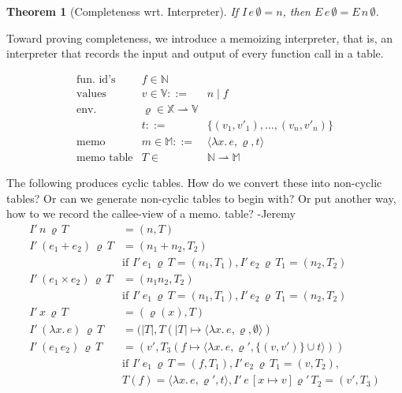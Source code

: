 \documentclass{tufte-handout}
\newcommand{\LAM}[1]{\lambda #1.\,}
\newcommand{\pto}[0]{\rightharpoonup}
\newcommand{\VAR}[0]{\mathbb{X}}
\newcommand{\ext}[3]{#3(#1{\mapsto}#2)}
\newtheorem{theorem}{Theorem}%
\begin{document}

\begin{theorem}[Completeness wrt. Interpreter]
If $I\,e\,\emptyset = n$, then $E\,e\,\emptyset = E\,n\,\emptyset$.
\end{theorem}

Toward proving completeness, we introduce a memoizing interpreter,
that is, an interpreter that records the input and output of every
function call in a table.


\[
\begin{array}{lrl}
 \text{fun. id's} & f \in \mathbb{N} \\
 \text{values} & v \in \mathbb{V} ::= & n \mid f \\
 \text{env.} & \varrho \in \VAR \pto \mathbb{V} \\
             & t ::= & \{ (v_1,v'_1), \ldots, (v_n,v'_n) \}\\
 \text{memo} & m \in \mathbb{M} ::= & \langle \LAM{x}e, \varrho, t \rangle\\
 \text{memo table} & T \in & \mathbb{N} \pto \mathbb{M}
\end{array}
\]

The following produces cyclic tables. How do we convert
these into non-cyclic tables? Or can we generate non-cyclic
tables to begin with? Or put another way, how to we record
the callee-view of a memo. table? -Jeremy
\begin{align*}
  I'\,n\,\varrho\,T &= (n,T) \\
  I'\,(e_1 + e_2)\,\varrho\,T &= (n_1 + n_2,T_2) \\
      & \text{if } I'\,e_1\,\varrho\,T = (n_1,T_1), I'\,e_2\,\varrho\,T_1 = (n_2,T_2) \\
  I'\,(e_1 \times e_2)\,\varrho\,T &= (n_1 n_2,T_2) \\
      & \text{if } I'\,e_1\,\varrho\,T = (n_1,T_1), I'\,e_2\,\varrho\,T_1 = (n_2,T_2) \\
  I'\,x\,\varrho\,T &= (\varrho(x),T) \\
  I'\,(\LAM{x}e)\,\varrho\,T &= (|T|, 
     \ext{|T|}{\langle \LAM{x}e, \varrho, \emptyset \rangle}{T} \\
  I'\,(e_1\,e_2)\,\varrho\,T &= (v',\ext{f}{\langle \LAM{x}e,\varrho',\{(v,v')\}\cup t \rangle}{T_3}) \\
  & \text{if } I'\,e_1\,\varrho\,T = (f,T_1),
      I'\,e_2\,\varrho\,T_1 = (v,T_2), \\
    &  T(f) = \langle \LAM{x}e,\varrho',t \rangle,
      I'\,e\,[x\mapsto v]\varrho'\,T_2 = (v',T_3)
\end{align*}
\end{document}

